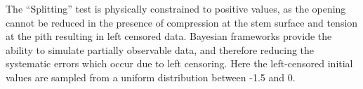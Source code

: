 The “Splitting” test is physically constrained to positive values, as the opening cannot be reduced in the presence of compression at the stem surface and tension at the pith resulting in left censored data. Bayesian frameworks provide the ability to simulate partially observable data, and therefore reducing the systematic errors which occur due to left censoring. Here the left-censored initial values are sampled from a uniform distribution between -1.5 and 0.

